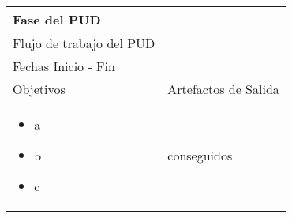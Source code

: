 
\begin{tabular}{|p{}|p{}|}

\hline

\cellcolor[gray]{0.7}Fase del \acs{PUD} &
 \\
\hline

\cellcolor[gray]{0.7}Flujo de trabajo del \acs{PUD} &
 \\
\hline

\cellcolor[gray]{0.7}Fechas Inicio - Fin  &
 \\
\hline

\cellcolor[gray]{0.7}Objetivos  &
\cellcolor[gray]{0.7}Artefactos de Salida \\
\hline

\begin{itemize}
\item a
\item b
\item c
\end{itemize}

&

conseguidos \\
\hline
\end{tabular}




